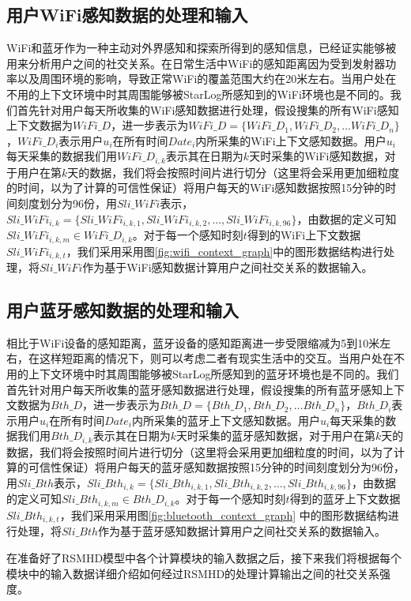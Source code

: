 \subsection{用户WiFi感知数据的处理和输入}
\label{sec:wifi_input}
WiFi和蓝牙作为一种主动对外界感知和探索所得到的感知信息，已经证实能够被用来分析用户之间的社交关系。在日常生活中WiFi的感知距离因为受到发射器功率以及周围环境的影响，导致正常WiFi的覆盖范围大约在20米左右。当用户处在不用的上下文环境中时其周围能够被StarLog所感知到的WiFi环境也是不同的。我们首先针对用户每天所收集的WiFi感知数据进行处理，假设搜集的所有WiFi感知上下文数据为$WiFi\_D$，进一步表示为$WiFi\_D=\{  WiFi\_D_{1},WiFi\_D_{2},...WiFi\_D_{n}  \}$，$WiFi\_D_{i}$表示用户$u_{i}$在所有时间$Date_{i}$内所采集的WiFi上下文感知数据。用户$u_{i}$每天采集的数据我们用$WiFi\_D_{i,k}$表示其在日期为$k$天时采集的WiFi感知数据，对于用户在第$k$天的数据，我们将会按照时间片进行切分（这里将会采用更加细粒度的时间，以为了计算的可信性保证）将用户每天的WiFi感知数据按照15分钟的时间刻度划分为96份，用$Sli\_WiFi$表示，$Sli\_WiFi_{i,k}=\{Sli\_WiFi_{i,k,1},Sli\_WiFi_{i,k,2},...,Sli\_WiFi_{i,k,96}\}$，由数据的定义可知$Sli\_WiFi_{i,k,m} \in WiFi\_D_{i,k}$。对于每一个感知时刻$t$得到的WiFi上下文数据$Sli\_WiFi_{i,k,t}$，我们采用采用图\ref{fig:wifi_context_graph}中的图形数据结构进行处理，将$Sli\_WiFi$作为基于WiFi感知数据计算用户之间社交关系的数据输入。
\subsection{用户蓝牙感知数据的处理和输入}
\label{sec:bl_input}
相比于WiFi设备的感知距离，蓝牙设备的感知距离进一步受限缩减为5到10米左右，在这样短距离的情况下，则可以考虑二者有现实生活中的交互。当用户处在不用的上下文环境中时其周围能够被StarLog所感知到的蓝牙环境也是不同的。我们首先针对用户每天所收集的蓝牙感知数据进行处理，假设搜集的所有蓝牙感知上下文数据为$Bth\_D$，进一步表示为$Bth\_D=\{Bth\_D_{1},Bth\_D_{2},...Bth\_D_{n} \}$，$Bth\_D_{i}$表示用户$u_{i}$在所有时间$Date_{i}$内所采集的蓝牙上下文感知数据。用户$u_{i}$每天采集的数据我们用$Bth\_D_{i,k}$表示其在日期为$k$天时采集的蓝牙感知数据，对于用户在第$k$天的数据，我们将会按照时间片进行切分（这里将会采用更加细粒度的时间，以为了计算的可信性保证）将用户每天的蓝牙感知数据按照15分钟的时间刻度划分为96份，用$Sli\_Bth$表示，$Sli\_Bth_{i,k}=\{Sli\_Bth_{i,k,1},Sli\_Bth_{i,k,2},...,Sli\_Bth_{i,k,96}\}$，由数据的定义可知$Sli\_Bth_{i,k,m} \in Bth\_D_{i,k}$。对于每一个感知时刻$t$得到的蓝牙上下文数据$Sli\_Bth_{i,k,t}$，我们采用采用图\ref{fig:bluetooth_context_graph} 中的图形数据结构进行处理，将$Sli\_Bth$作为基于蓝牙感知数据计算用户之间社交关系的数据输入。
\par 在准备好了RSMHD模型中各个计算模块的输入数据之后，接下来我们将根据每个模块中的输入数据详细介绍如何经过RSMHD的处理计算输出之间的社交关系强度。
